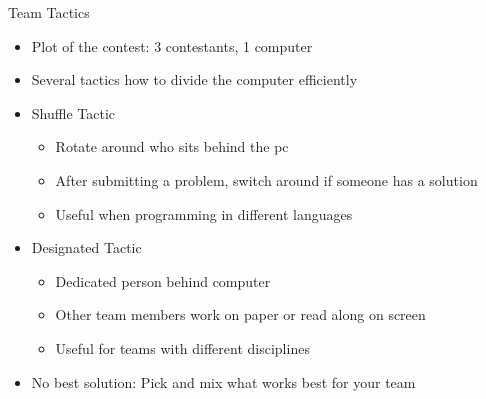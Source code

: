 \documentclass[11pt,pdf, aspectratio=169]{beamer}
\begin{document}
  \begin{frame}{Team Tactics}
    \begin{itemize}
      \item<1-> Plot of the contest: 3 contestants, 1 computer
      \item<2-> Several tactics how to divide the computer efficiently
      \item<3-> Shuffle Tactic\begin{itemize}
                                \item<4-> Rotate around who sits behind the pc
                                \item<4-> After submitting a problem, switch around if someone has a solution
                                \item<4-> Useful when programming in different languages
      \end{itemize}
      \item<3-> Designated Tactic\begin{itemize}
                                   \item<5->Dedicated person behind computer
                                   \item<5-> Other team members work on paper or read along on screen
                                   \item<5-> Useful for teams with different disciplines
      \end{itemize}
      \item<3-> No best solution: Pick and mix what works best for your team
    \end{itemize}
  \end{frame}
\end{document}
